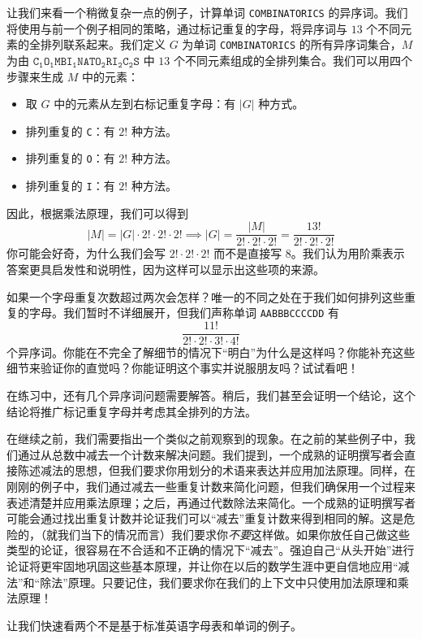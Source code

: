 \begin{example}
    让我们来看一个稍微复杂一点的例子，计算单词 \verb|COMBINATORICS| 的异序词。我们将使用与前一个例子相同的策略，通过标记重复的字母，将异序词与 $13$ 个不同元素的全排列联系起来。我们定义 $G$ 为单词 \verb|COMBINATORICS| 的所有异序词集合，$M$ 为由 ${\mathtt{C_1O_1MBI_1NATO_2RI_2C_2S}}$ 中 $13$ 个不同元素组成的全排列集合。我们可以用四个步骤来生成 $M$ 中的元素：
    \begin{itemize}
        \item 取 $G$ 中的元素从左到右标记重复字母：有 $|G|$ 种方式。
        \item 排列重复的 \verb|C|：有 $2!$ 种方法。
        \item 排列重复的 \verb|O|：有 $2!$ 种方法。
        \item 排列重复的 \verb|I|：有 $2!$ 种方法。
    \end{itemize}
    因此，根据乘法原理，我们可以得到
    \[|M| = |G| \cdot 2! \cdot 2! \cdot 2! \implies |G| = \frac{|M|}{2! \cdot 2! \cdot 2!} = \frac{13!}{2! \cdot 2! \cdot 2!}\]
    你可能会好奇，为什么我们会写 $2! \cdot 2! \cdot 2!$ 而不是直接写 $8$。我们认为用阶乘表示答案更具启发性和说明性，因为这样可以显示出这些项的来源。

    如果一个字母重复次数超过两次会怎样？唯一的不同之处在于我们如何排列这些重复的字母。我们暂时不详细展开，但我们声称单词 \verb|AABBBCCCCDD| 有
    \[\frac{11!}{2! \cdot 2! \cdot 3! \cdot 4!}\]
    个异序词。你能在不完全了解细节的情况下``明白''为什么是这样吗？你能补充这些细节来验证你的直觉吗？你能证明这个事实并说服朋友吗？试试看吧！
\end{example}

在练习中，还有几个异序词问题需要解答。稍后，我们甚至会证明一个结论，这个结论将推广标记重复字母并考虑其全排列的方法。

在继续之前，我们需要指出一个类似之前观察到的现象。在之前的某些例子中，我们通过从总数中减去一个计数来解决问题。我们提到，一个成熟的证明撰写者会直接陈述减法的思想，但我们要求你用划分的术语来表达并应用加法原理。同样，在刚刚的例子中，我们通过减去一些重复计数来简化问题，但我们确保用一个过程来表述清楚并应用乘法原理；之后，再通过代数除法来简化。一个成熟的证明撰写者可能会通过找出重复计数并论证我们可以``减去''重复计数来得到相同的解。这是危险的，（就我们当下的情况而言）我们要求你\emph{不要}这样做。如果你放任自己做这些类型的论证，很容易在不合适和不正确的情况下``减去''。强迫自己``从头开始''进行论证将更牢固地巩固这些基本原理，并让你在以后的数学生涯中更自信地应用``减法''和``除法''原理。只要记住，我们要求你在我们的上下文中只使用加法原理和乘法原理！

让我们快速看两个不是基于标准英语字母表和单词的例子。

